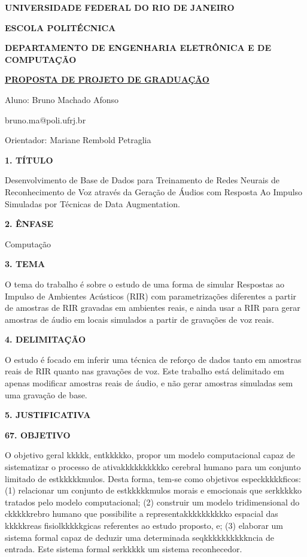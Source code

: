 \documentclass[a4paper,12pt,oneside,openany]{report}
\begin{document}
\begin{center}
\textbf{UNIVERSIDADE FEDERAL DO RIO DE JANEIRO}
\vspace{-0.2cm}

\textbf{ESCOLA POLITÉCNICA}
\vspace{-0.2cm}

\textbf{DEPARTAMENTO DE ENGENHARIA ELETRÔNICA E DE COMPUTAÇÃO}
\vspace{0.8cm}

\underline{\textbf{PROPOSTA DE PROJETO DE GRADUAÇÃO}}

Aluno: Bruno Machado Afonso
\vspace{-0.2cm}

bruno.ma@poli.ufrj.br

Orientador: Mariane Rembold Petraglia
\end{center}

\textbf{1. TÍTULO}

Desenvolvimento de Base de Dados para Treinamento de Redes Neurais de Reconhecimento de Voz através da Geração de Áudios com Resposta
Ao Impulso Simuladas por Técnicas de Data Augmentation.

\vspace{0.4cm}
\textbf{2. ÊNFASE}

Computação

\vspace{0.4cm}
\textbf{3. TEMA}

O tema do trabalho é sobre o estudo de uma forma de simular Respostas ao Impulso de Ambientes Acústicos (RIR) com parametrizações diferentes a partir de amostras de RIR gravadas em ambientes
reais, e ainda usar a RIR para gerar amostras de áudio em locais simulados a partir de gravações de voz reais.

\vspace{0.4cm}
\textbf{4. DELIMITAÇÃO}

O estudo é focado em inferir uma técnica de reforço de dados tanto em amostras reais de RIR quanto nas gravações de voz. Este trabalho está delimitado em apenas modificar amostras reais de áudio,
e não gerar amostras simuladas sem uma gravação de base.

\vspace{0.4cm}
\textbf{5. JUSTIFICATIVA}



\vspace{0.4cm}
\textbf{67. OBJETIVO}

O objetivo geral kkkkk, entkkkkko, propor um modelo computacional capaz de sistematizar o processo de ativakkkkkkkkkko cerebral humano para um conjunto limitado de estkkkkkmulos. Desta forma, tem-se como objetivos especkkkkkficos: (1) relacionar um conjunto de estkkkkkmulos morais e emocionais que serkkkkko tratados pelo modelo computacional; (2) construir um modelo tridimensional do ckkkkkrebro humano que possibilite a representakkkkkkkkkko espacial das kkkkkreas fisiolkkkkkgicas referentes ao estudo proposto, e; (3) elaborar um sistema formal capaz de deduzir uma determinada seqkkkkkkkkkkncia de entrada. Este sistema formal serkkkkk um sistema reconhecedor.
\end{document}
